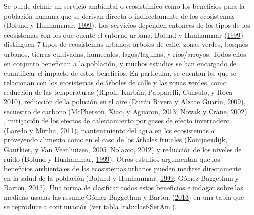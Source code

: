 \documentclass[12pt,a4paper,openany]{book}
\theoremstyle{definition}
\theoremstyle{definition}
\theoremstyle{definition}
\theoremstyle{remark}
\begin{document}
Se puede definir un servicio ambiental o ecosistémico como los
beneficios para la población humana que se derivan directa o
indirectamente de los ecosistemas (Bolund y Hunhammar,
\protect\hyperlink{ref-bolund_ecosystem_1999}{1999}). Los servicios
dependen entonces de los tipos de los ecosistemas con los que cuente el
entorno urbano. Bolund y Hunhammar
(\protect\hyperlink{ref-bolund_ecosystem_1999}{1999}) distinguen 7 tipos
de ecosistemas urbanos: árboles de calle, zonas verdes, bosques urbanos,
tierras cultivadas, humedales, lagos/lagunas, y ríos/arroyos. Todos
ellos en conjunto benefician a la población, y muchos estudios se han
encargado de cuantificar el impacto de estos beneficios. En particular,
se cuentan los que se relacionan con los ecosistemas de árboles de calle
y las zonas verdes, como reducción de las temperaturas (Ripoll, Kurbán,
Papparelli, Cúnsulo, y Roca,
\protect\hyperlink{ref-ripoll_condiciones_2010}{2010}), reducción de la
polución en el aire (Durán Rivera y Alzate Guarín,
\protect\hyperlink{ref-duran_rivera_intercepcion_2009}{2009}), secuestro
de carbono (McPherson, Xiao, y Aguaron,
\protect\hyperlink{ref-mcpherson2013new}{2013}; Nowak y Crane,
\protect\hyperlink{ref-nowak_carbon_2002}{2002}) , mitigación de los
efectos de calentamiento por gases de efecto invernadero (Laredo y
Mirtha, \protect\hyperlink{ref-laredo_gestion_2011}{2011}),
mantenimiento del agua en los ecosistemas o proveyendo alimento como en
el caso de los árboles frutales (Konijnendijk, Gauthier, y Van
Veenhuizen, \protect\hyperlink{ref-konijnendijk_arboles_2005}{2005};
Nolazco, \protect\hyperlink{ref-nolazco_diversidad_2012}{2012}) y
reducción de los niveles de ruido (Bolund y Hunhammar,
\protect\hyperlink{ref-bolund_ecosystem_1999}{1999}). Otros estudios
argumentan que los beneficios ambientales de los ecosistemas urbanos
pueden medirse directamente en la salud de la población (Bolund y
Hunhammar, \protect\hyperlink{ref-bolund_ecosystem_1999}{1999};
Gómez-Baggethun y Barton,
\protect\hyperlink{ref-gomez-baggethun_classifying_2013}{2013}). Una
forma de clasificar todos estos beneficios e indagar sobre las medidas
usadas las resume Gómez-Baggethun y Barton
(\protect\hyperlink{ref-gomez-baggethun_classifying_2013}{2013}) en una
tabla que se reproduce a continuación (ver tabla \ref{tab:clasf-SerAm}).
\end{document}
